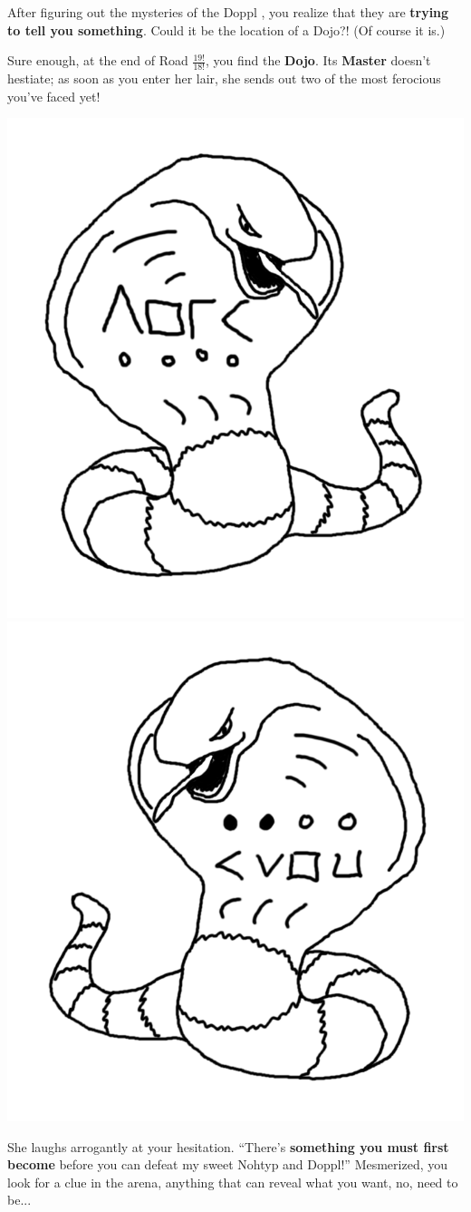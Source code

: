 

After figuring out the mysteries of the Doppl \mappMobimon{}, you realize
that they are \textbf{trying to tell you something}. Could it be the location of
a \mappMobimon{} Dojo?! (Of course it is.)

Sure enough, at the end of Road \(\frac{19!}{18!}\), you find the \textbf{Dojo}.
Its \textbf{Master} doesn't hestiate; as soon as you enter her lair,
she sends out two of the most ferocious \mappMobimon{} you've faced yet!

\begin{center}
\includegraphics[width=0.4\linewidth]{assets/not-arbok-1.png}
\includegraphics[width=0.4\linewidth]{assets/not-arbok-2.png}
\end{center}

She laughs arrogantly at your hesitation.
``There's \textbf{something you must first become} before you can defeat
my sweet Nohtyp and Doppl!'' Mesmerized, you look for a clue in the arena,
anything that can reveal what you want, no, need to be...


